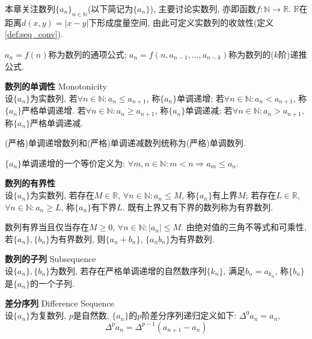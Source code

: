 
\par 本章关注数列$\{a_n\}_{n\in \mathbb{N}}$(以下简记为$\{a_n\}$), 主要讨论实数列, 亦即函数$f: \mathbb{N}\to \mathbb{R}$. $\mathbb{R}$在距离$d(x,y)=|x-y|$下形成度量空间, 由此可定义实数列的收敛性(定义\ref{def:seq_conv}). 
\par $a_n=f(n)$称为数列的通项公式; $a_n=f(n,a_{n-1}, \dots,a_{n-k})$称为数列的($k$阶)递推公式. 

\begin{dfn}\textbf{数列的单调性} Monotonicity\\
设$\{a_n\}$为实数列, 若$\forall n\in \mathbb{N}: a_n\le a_{n+1}$, 称$\{a_n\}$单调递增; 若$\forall n\in \mathbb{N}: a_n<a_{n+1}$, 称$\{a_n\}$严格单调递增. 若$\forall n\in \mathbb{N}: a_n\ge a_{n+1}$, 称$\{a_n\}$单调递减; 若$\forall n\in \mathbb{N}: a_n>a_{n+1}$, 称$\{a_n\}$严格单调递减. 
\end{dfn}
(严格)单调递增数列和(严格)单调递减数列统称为(严格)单调数列. 

\par $\{a_n\}$单调递增的一个等价定义为: $\forall m, n\in \mathbb{N}: m<n \Rightarrow a_m \le a_n$.

\begin{dfn}\textbf{数列的有界性}\\
设$\{a_n\}$为实数列, 若存在$M\in \mathbb{R}$, $\forall n\in \mathbb{N}: a_n\le M$, 称$\{a_n\}$有上界$M$; 若存在$L\in \mathbb{R}$, $\forall n\in \mathbb{N}: a_n\ge L$, 称$\{a_n\}$有下界$L$. 既有上界又有下界的数列称为有界数列. 
\end{dfn}
\par 数列有界当且仅当存在$M\ge 0$, $\forall n\in \mathbb{N}: |a_n|\le M$. 由绝对值的三角不等式和可乘性, 若$\{a_n\}, \{b_n\}$为有界数列, 则$\{a_n+b_n\}$, $\{a_nb_n\}$为有界数列. 

\begin{dfn}\textbf{数列的子列} Subsequence\\
设$\{a_n\}, \{b_n\}$为数列, 若存在严格单调递增的自然数序列$\{k_n\}$, 满足$b_n=a_{k_n}$, 称$\{b_n\}$是$\{a_n\}$的一个子列. 
\end{dfn}

\begin{dfn}\textbf{差分序列} Difference Sequence\\
设$\{a_n\}$为复数列, $p$是自然数, $\{a_n\}$的$p$阶差分序列递归定义如下: $\Delta^0 a_n = a_n$, 
\begin{equation}
    \Delta^p a_n = \Delta^{p-1} (a_{n+1} - a_n)
\end{equation}
\end{dfn}



